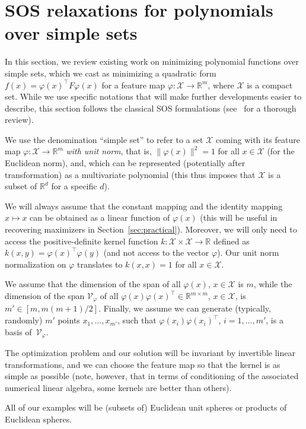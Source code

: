 \documentclass[11pt]{article}
\newcommand{\rb}{\mathbb{R}}
\newcommand{\mysec}[1]{Section~\ref{sec:#1}}
\def \X{{\mathcal X}}
\def \V{{\mathcal V}}
\begin{document}
 
    



\section{SOS relaxations for polynomials over simple sets}
\label{sec:sos}
In this section, we review existing work on minimizing polynomial functions over simple sets, which we cast as minimizing a quadratic form $f(x) = \varphi(x)^\top F \varphi(x)$ for a feature map $\varphi: \X \to \rb^m$, where $\X$ is a compact set. While we use specific notations that will make further developments easier to describe, this section follows the classical SOS formulations (see~\cite{lasserre2010moments,henrion2020moment} for a thorough review).

We use the denomination ``simple set'' to refer to a set $\X$ coming with its feature map $\varphi:\X \to \rb^m$ \emph{with unit norm}, that is, $\| \varphi(x) \|^2 = 1$ for all $x \in \X$ (for the Euclidean norm), and, which can be represented (potentially after transformation) as a multivariate polynomial (this thus imposes that $\X$ is a subset of $\rb^d$ for a specific $d$).

We will always assume that the constant mapping and the identity mapping $x \mapsto x$ can be obtained as a linear function of $\varphi(x)$ (this will be useful in recovering maximizers in \mysec{practical}). Moreover, we will only need to access the positive-definite kernel function $k: \X \times \X \to \rb$ defined as $k(x,y) =  \varphi(x)^\top \varphi(y)$ (and not access to the vector $\varphi$). Our unit norm normalization on $\varphi$ translates to $k(x,x)=1$ for all $x \in \X$.


We assume that the dimension of the span  of all $\varphi(x)$, $x \in \X$ is $m$, while the dimension of the span $\V_\varphi$ of all  $\varphi(x) \varphi(x)^\top \in \rb^{m \times m}$, $x \in \X$, is $m' \in [m, m(m+1)/2]$. Finally, we assume we can generate (typically, randomly) $m'$ points $x_1,\dots,x_{m'}$, such that $\varphi(x_i) \varphi(x_i)^\top $, $i=1,\dots,m'$, is a basis of~$\V_\varphi$.


The optimization problem and our solution will be invariant by invertible linear transformations, and we can choose the feature map so that the kernel is as simple as possible (note, however, that in terms of conditioning of the associated numerical linear algebra, some kernels are better than others).

All of our examples will be (subsets of) Euclidean unit spheres or products of  Euclidean spheres.
\end{document}
